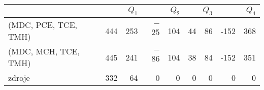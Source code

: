 \begin{tabular}{lr@{${}\pm{}$}rr@{${}\pm{}$}rr@{${}\pm{}$}rr@{${}\pm{}$}r}
\toprule
   & \multicolumn{2}{r}{$Q_1$}  & \multicolumn{2}{r}{$Q_2$}  & \multicolumn{2}{r}{$Q_3$}  & \multicolumn{2}{r}{$Q_4$} \\
\midrule
(MDC, PCE, TCE, TMH) & 444&253 & $-$25&104 & 44&86 & -152&368 \\
(MDC, MCH, TCE, TMH) & 445&241 & $-$86&104 & 38&84 & -152&351 \\
\midrule
zdroje & 332&64 & 0&0 & 0&0 & 0&0 \\
\bottomrule
\end{tabular}
